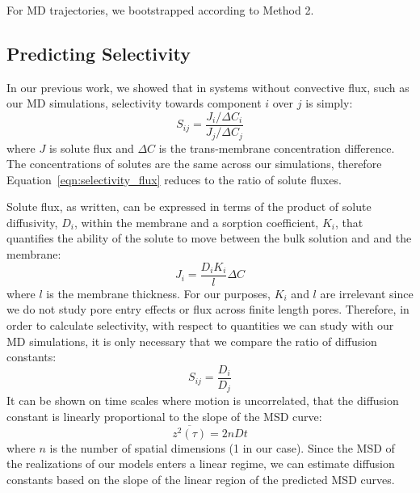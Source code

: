 \documentclass[journal=jpcbfk,manuscript=article]{achemso}
\begin{document}
  For MD trajectories, we bootstrapped according to Method 2.
  
  \subsection{Predicting Selectivity}\label{method:selectivity}
  
  In our previous work, we showed that in systems without convective flux, such
  as our MD simulations, selectivity towards component $i$ over $j$ is simply:
  \begin{equation}
  S_{ij} = \frac{J_i / \Delta C_i}{J_j / \Delta C_j}
  \label{eqn:selectivity_flux}
  \end{equation}
  where $J$ is solute flux and $\Delta C$ is the trans-membrane concentration
  difference.~\cite{coscia_capturing_2020} The concentrations of solutes are the
  same across our simulations, therefore Equation~\ref{eqn:selectivity_flux} 
  reduces to the ratio of solute fluxes. 
  
  Solute flux, as written, can be expressed in terms of the product of solute 
  diffusivity, $D_i$, within the membrane and a sorption coefficient, $K_i$, 
  that quantifies the ability of the solute to move between the bulk solution
  and and the membrane:
  \begin{equation}
    J_i = \frac{D_i K_i}{l}\Delta C
  \end{equation}
  where $l$ is the membrane thickness. For our purposes, $K_i$ and $l$ are 
  irrelevant since we do not study pore entry effects or flux across finite
  length pores. Therefore, in order to calculate selectivity, with respect
  to quantities we can study with our MD simulations, it is only necessary that
  we compare the ratio of diffusion constants:
  \begin{equation}
    S_{ij} = \frac{D_i}{D_j}
    \label{eqn:selectivity_diffusivity}
  \end{equation}
  It can be shown on time scales where motion is uncorrelated, that the diffusion
  constant is linearly proportional to the slope of the MSD curve:~\cite{einstein_investigations_1956}
  \begin{equation}
    \overline{z^2(\tau)} = 2 n D t
    \label{eqn:msd_D}
  \end{equation}
  where $n$ is the number of spatial dimensions (1 in our case). Since the MSD
  of the realizations of our models 
  enters a linear regime, we can estimate diffusion constants 
  based on the slope of the linear region of the predicted MSD curves. 
\end{document}
